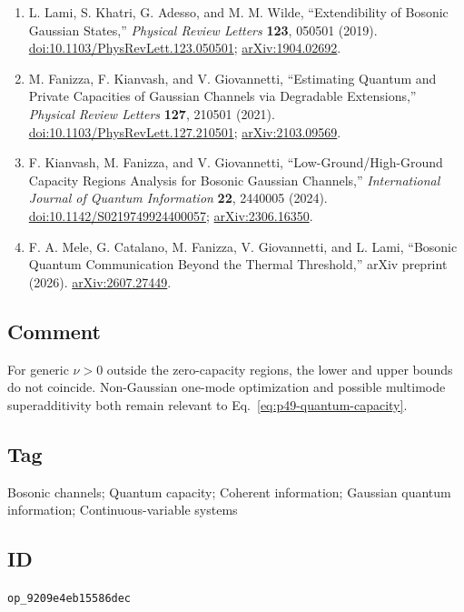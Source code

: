 \begin{enumerate}[label={},leftmargin=4.8em,labelsep=0.5em]
  \item[\textup{[LKA+19]}]\label{ref:p49-lami-et-al}
  L. Lami, S. Khatri, G. Adesso, and M. M. Wilde,
  ``Extendibility of Bosonic Gaussian States,''
  \emph{Physical Review Letters} \textbf{123}, 050501 (2019).
  \href{https://doi.org/10.1103/PhysRevLett.123.050501}%
       {doi:10.1103/PhysRevLett.123.050501};
  \href{https://arxiv.org/abs/1904.02692}{arXiv:1904.02692}.

  \item[\textup{[FKG21]}]\label{ref:p49-fanizza-kianvash-giovannetti}
  M. Fanizza, F. Kianvash, and V. Giovannetti,
  ``Estimating Quantum and Private Capacities of Gaussian Channels via
  Degradable Extensions,''
  \emph{Physical Review Letters} \textbf{127}, 210501 (2021).
  \href{https://doi.org/10.1103/PhysRevLett.127.210501}%
       {doi:10.1103/PhysRevLett.127.210501};
  \href{https://arxiv.org/abs/2103.09569}{arXiv:2103.09569}.

  \item[\textup{[KFG24]}]\label{ref:p49-kianvash-fanizza-giovannetti}
  F. Kianvash, M. Fanizza, and V. Giovannetti,
  ``Low-Ground/High-Ground Capacity Regions Analysis for Bosonic Gaussian
  Channels,''
  \emph{International Journal of Quantum Information} \textbf{22}, 2440005
  (2024).
  \href{https://doi.org/10.1142/S0219749924400057}%
       {doi:10.1142/S0219749924400057};
  \href{https://arxiv.org/abs/2306.16350}{arXiv:2306.16350}.

  \item[\textup{[MCF+26]}]\label{ref:p49-mele-et-al}
  F. A. Mele, G. Catalano, M. Fanizza, V. Giovannetti, and L. Lami,
  ``Bosonic Quantum Communication Beyond the Thermal Threshold,''
  arXiv preprint (2026).
  \href{https://arxiv.org/abs/2607.27449}{arXiv:2607.27449}.
\end{enumerate}

\subsection*{Comment}

For generic $\nu>0$ outside the zero-capacity regions, the lower and upper
bounds do not coincide.  Non-Gaussian one-mode optimization and possible
multimode superadditivity both remain relevant to
Eq.~\eqref{eq:p49-quantum-capacity}.

\subsection*{Tag}

Bosonic channels; Quantum capacity; Coherent information;
Gaussian quantum information; Continuous-variable systems

\subsection*{ID}

\texttt{op\_9209e4eb15586dec}

